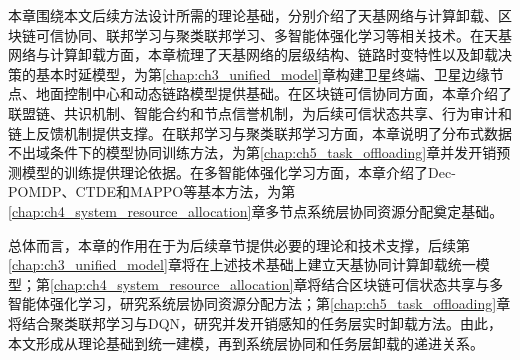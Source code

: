 本章围绕本文后续方法设计所需的理论基础，分别介绍了天基网络与计算卸载、区块链可信协同、联邦学习与聚类联邦学习、多智能体强化学习等相关技术。在天基网络与计算卸载方面，本章梳理了天基网络的层级结构、链路时变特性以及卸载决策的基本时延模型，为第\ref{chap:ch3_unified_model}章构建卫星终端、卫星边缘节点、地面控制中心和动态链路模型提供基础。在区块链可信协同方面，本章介绍了联盟链、共识机制、智能合约和节点信誉机制，为后续可信状态共享、行为审计和链上反馈机制提供支撑。在联邦学习与聚类联邦学习方面，本章说明了分布式数据不出域条件下的模型协同训练方法，为第\ref{chap:ch5_task_offloading}章并发开销预测模型的训练提供理论依据。在多智能体强化学习方面，本章介绍了Dec-POMDP、CTDE和MAPPO等基本方法，为第\ref{chap:ch4_system_resource_allocation}章多节点系统层协同资源分配奠定基础。

总体而言，本章的作用在于为后续章节提供必要的理论和技术支撑，后续第\ref{chap:ch3_unified_model}章将在上述技术基础上建立天基协同计算卸载统一模型；第\ref{chap:ch4_system_resource_allocation}章将结合区块链可信状态共享与多智能体强化学习，研究系统层协同资源分配方法；第\ref{chap:ch5_task_offloading}章将结合聚类联邦学习与DQN，研究并发开销感知的任务层实时卸载方法。由此，本文形成从理论基础到统一建模，再到系统层协同和任务层卸载的递进关系。
